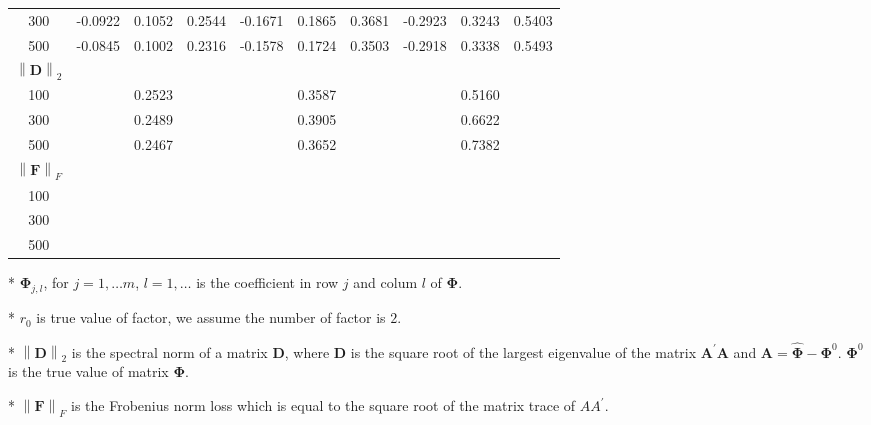 \documentclass[12pt,a4paper,hyperref]{article}
\begin{document}
\begin{table}[H]
\begin{threeparttable}
\begin{tabular} {*{10}{c}}
300& -0.0922 & 0.1052 & 0.2544&	-0.1671&0.1865&0.3681	& -0.2923& 0.3243& 0.5403\\
500&-0.0845 &0.1002&0.2316   &	-0.1578 &	0.1724&0.3503 &-0.2918&0.3338&	0.5493  \\
\cmidrule(lr){1-10}
$\left\| \boldsymbol{D} \right\|_{2} $\\
\cmidrule(lr){1-4}   \cmidrule(lr){5-7}   \cmidrule(lr){8-10}
100&  & 0.2523& &	  &0.3587	& & &0.5160 &   \\
300&   & 0.2489& &	  &	0.3905&	& &0.6622&  \\
500& & 0.2467&   &	  &0.3652	& & &0.7382&	  \\
\cmidrule(lr){1-10}
$\left\| \boldsymbol{F} \right\|_{F} $\\
\cmidrule(lr){1-4}   \cmidrule(lr){5-7}   \cmidrule(lr){8-10}
100&  & & &	  &	& & & &   \\
300&   &  & &	  &	&	& & &  \\
500& &  &   &	  &	& & & &	  \\
\bottomrule
\end{tabular}
\begin{tablenotes}
\footnotesize
  \item[*] $\boldsymbol{\Phi}_{j,l}$, for $j=1,\ldots m$, $l=1,\ldots$ is the coefficient in row $j$ and colum $l$ of $\boldsymbol{\Phi}$.
\item[*] $r_{0}$ is true value of factor, we assume the number of factor is $2$.
 \item[*] $\left\| \boldsymbol{D} \right\|_{2}$ is the spectral norm of a matrix $\boldsymbol{D}$, where $\boldsymbol{D}$ is the square root of the largest eigenvalue of the matrix $\boldsymbol{A}^{'}\boldsymbol{A}$ and $\boldsymbol{A}=\hat{\boldsymbol{\Phi}}- \boldsymbol{\Phi}^{0}$. $\boldsymbol{\Phi}^{0}$ is the true value of matrix $\boldsymbol{\Phi}$.
 \item[*] $\left\| \boldsymbol{F} \right\|_{F} $ is the Frobenius norm loss which is equal to the square root of the matrix trace of $AA^{'}$.
    \end{tablenotes}
\end{threeparttable}
\end{table}
\end{document}
